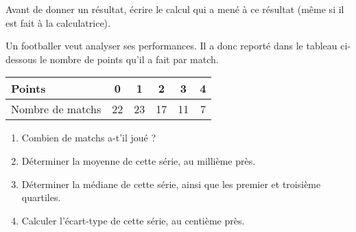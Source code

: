 \documentclass[
	classe=$2^{de}$
]{évaluation}
\begin{document}
\begin{exercice}[6]

	\begin{tcolorbox}
		Avant de donner un résultat, écrire le calcul qui a mené à ce résultat (même si il est fait à la calculatrice).
	\end{tcolorbox}

	Un footballer veut analyser ses performances. Il a donc reporté dans le tableau ci-dessous le nombre de points qu'il a fait par match.

	\begin{center}
		\begin{tabular}{|l|c|c|c|c|c|}
			\hline
			Points           & 0  & 1  & 2  & 3  & 4 \\ \hline
			Nombre de matchs & 22 & 23 & 17 & 11 & 7 \\ \hline
		\end{tabular}
	\end{center}

	\begin{enumerate}
		\item Combien de matchs a-t'il joué ?

		      \vspace{2em}
		\item Déterminer la moyenne de cette série, au millième près.

		      \vspace{2em}
		\item Déterminer la médiane de cette série, ainsi que les premier et troisième quartiles.

		      \vspace{2em}
		\item Calculer l'écart-type de cette série, au centième près.

		      \vspace{2em}
	\end{enumerate}
\end{exercice}
\end{document}
